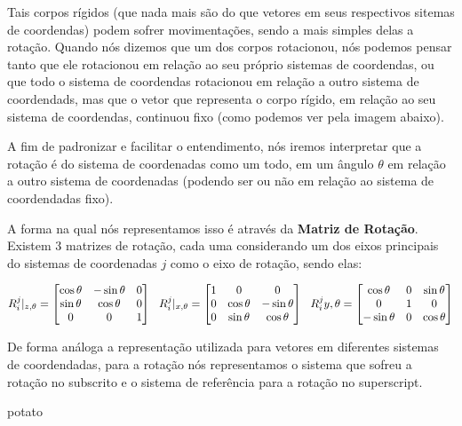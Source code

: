 \documentclass{article}
\begin{document}
            Tais corpos rígidos (que nada mais são do que vetores em seus respectivos sitemas de coordendas) podem sofrer movimentações, sendo a mais simples delas a rotação. Quando nós dizemos que um dos corpos rotacionou, nós podemos pensar tanto que ele rotacionou em relação ao seu próprio sistemas de coordendas, ou que todo o sistema de coordendas rotacionou em relação a outro sistema de coordendads, mas que o vetor que representa o corpo rígido, em relação ao seu sistema de coordendas, continuou fixo (como podemos ver pela imagem abaixo). 

            A fim de padronizar e facilitar o entendimento, nós iremos interpretar que a rotação é do sistema de coordenadas como um todo, em um ângulo $\theta$ em relação a outro sistema de coordenadas (podendo ser ou não em relação ao sistema de coordendadas fixo).

            A forma na qual nós representamos isso é através da \textbf{Matriz de Rotação}. Existem 3 matrizes de rotação, cada uma considerando um dos eixos principais do sistemas de coordenadas $j$ como o eixo de rotação, sendo elas:
            
            \begin{align}
                R_i^j|_{z, \theta} = \begin{bmatrix}
                                \cos \theta & -\sin \theta & 0 \\ 
                                \sin \theta & \cos \theta  & 0 \\ 
                                0           &        0     & 1
                                \end{bmatrix} \ \ 
                \vspace*{15px}
                R_i^j|_{x, \theta} = \begin{bmatrix}
                                1           &        0    & 0 \\
                                0           & \cos \theta & -\sin \theta  \\ 
                                0           & \sin \theta & \cos \theta   
                                \end{bmatrix} \ \
                R_i^j{y, \theta} = \begin{bmatrix}
                                \cos \theta & 0 & \sin \theta  \\ 
                                0           &        1     & 0 \\
                                -\sin \theta & 0 & \cos \theta \\ 
                                \end{bmatrix} 
            \end{align}

            De forma análoga a representação utilizada para vetores em diferentes sistemas de coordendadas, para a rotação nós representamos o sistema que sofreu a rotação no subscrito e o sistema de referência para a rotação no superscript. 
    \newpage
    \begin{note}
        potato
    \end{note}
\end{document}
